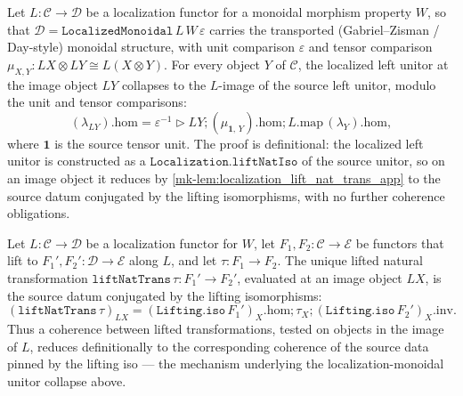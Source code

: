 \begin{lemma}
  \label{mk-lem:localization_monoidal_left_unitor_hom_app}
  \mathlibok

  Let \(L : \mathcal{C} \to \mathcal{D}\) be a localization functor for a monoidal morphism property
  \(W\), so that \(\mathcal{D} = \mathtt{LocalizedMonoidal}\,L\,W\,\varepsilon\) carries the transported
  (Gabriel--Zisman / Day-style) monoidal structure, with unit comparison \(\varepsilon\) and tensor
  comparison \(\mu_{X,Y} : L X \otimes L Y \cong L(X \otimes Y)\). For every object \(Y\) of
  \(\mathcal{C}\), the localized left unitor at the image object \(L Y\) collapses to the \(L\)-image of
  the source left unitor, modulo the unit and tensor comparisons:
  \[
    (\lambda_{L Y}).\mathrm{hom}
      = \varepsilon^{-1} \rhd L Y
        \mathbin{;} (\mu_{\mathbf 1,\,Y}).\mathrm{hom}
        \mathbin{;} L.\mathrm{map}\,(\lambda_Y).\mathrm{hom},
  \]
  where \(\mathbf 1\) is the source tensor unit. The proof is definitional: the localized left unitor
  is constructed as a \(\mathtt{Localization.liftNatIso}\) of the source unitor, so on an image object it
  reduces by \ref{mk-lem:localization_lift_nat_trans_app} to the source datum conjugated by the lifting
  isomorphisms, with no further coherence obligations.
\end{lemma}

\begin{lemma}
  \label{mk-lem:localization_lift_nat_trans_app}
  \mathlibok

  Let \(L : \mathcal{C} \to \mathcal{D}\) be a localization functor for \(W\), let \(F_1, F_2 :
  \mathcal{C} \to \mathcal{E}\) be functors that lift to \(F_1', F_2' : \mathcal{D} \to \mathcal{E}\)
  along \(L\), and let \(\tau : F_1 \to F_2\). The unique lifted natural transformation
  \(\mathtt{liftNatTrans}\,\tau : F_1' \to F_2'\), evaluated at an image object \(L X\), is the source
  datum conjugated by the lifting isomorphisms:
  \[
    (\mathtt{liftNatTrans}\,\tau)_{L X}
      = (\mathtt{Lifting.iso}\,F_1')_{X}.\mathrm{hom}
        \mathbin{;} \tau_X
        \mathbin{;} (\mathtt{Lifting.iso}\,F_2')_{X}.\mathrm{inv}.
  \]
  Thus a coherence between lifted transformations, tested on objects in the image of \(L\), reduces
  definitionally to the corresponding coherence of the source data pinned by the lifting iso --- the
  mechanism underlying the localization-monoidal unitor collapse above.
\end{lemma}

